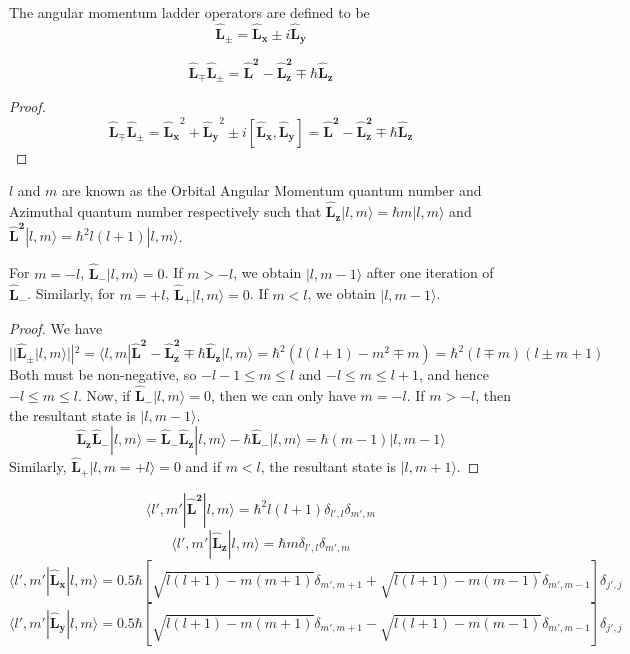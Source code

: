 \documentclass[a4paper]{article}
\begin{document}
\begin{defi}
The angular momentum ladder operators are defined to be
$$\mathbf{\hat{L}_{\pm}}=\mathbf{\hat{L}_x}\pm i\mathbf{\hat{L}_y}$$
\end{defi}
\begin{thm}
$$\mathbf{\hat{L}_{\mp}}\mathbf{\hat{L}_{\pm}}=\mathbf{\hat{L}^2}-\mathbf{\hat{L}_z^2}\mp\hbar\mathbf{\hat{L}_z}$$
\end{thm}
\begin{proof}
$$\mathbf{\hat{L}_{\mp}}\mathbf{\hat{L}_{\pm}}=\mathbf{\hat{L}_x}^2+\mathbf{\hat{L}_y}^2\pm i[\mathbf{\hat{L}_x},\mathbf{\hat{L}_y}]=\mathbf{\hat{L}^2}-\mathbf{\hat{L}_z^2}\mp\hbar\mathbf{\hat{L}_z}$$
\end{proof}
\begin{defi}[$l$ and $m$]
$l$ and $m$ are known as the Orbital Angular Momentum quantum number and Azimuthal quantum number respectively such that $\mathbf{\hat{L}_z}|l,m\rangle=\hbar m|l,m\rangle$ and $\mathbf{\hat{L}^2}|l,m\rangle=\hbar^2l(l+1)|l,m\rangle$.
\end{defi}
\begin{thm}
For $m=-l$, $\mathbf{\hat{L}_-}|l,m\rangle=0$. If $m>-l$, we obtain $|l,m-1\rangle$ after one iteration of $\mathbf{\hat{L}_-}$. Similarly, for $m=+l$, $\mathbf{\hat{L}_+}|l,m\rangle=0$. If $m<l$, we obtain $|l,m-1\rangle$.
\end{thm}
\begin{proof}
We have
$$||\mathbf{\hat{L}_{\pm}}|l,m\rangle||^2=\langle l,m|\mathbf{\hat{L}^2}-\mathbf{\hat{L}_z^2}\mp\hbar\mathbf{\hat{L}_z}|l,m\rangle=\hbar^2(l(l+1)-m^2\mp m)=\hbar^2(l\mp m)(l\pm m+1)$$
Both must be non-negative, so $-l-1\leq m\leq l$ and $-l\leq m\leq l+1$, and hence $-l\leq m\leq l$. Now, if $\mathbf{\hat{L}_-}|l,m\rangle=0$, then we can only have $m=-l$. If $m>-l$, then the resultant state is $|l,m-1\rangle$.
$$\mathbf{\hat{L}_z}\mathbf{\hat{L}_-}|l,m\rangle=\mathbf{\hat{L}_-}\mathbf{\hat{L}_z}|l,m\rangle-\hbar\mathbf{\hat{L}_-}|l,m\rangle=\hbar(m-1)|l,m-1\rangle$$
Similarly, $\mathbf{\hat{L}_+}|l,m=+l\rangle=0$ and if $m<l$, the resultant state is $|l,m+1\rangle$.
\end{proof}
\begin{thm}
$$\langle l',m'|\mathbf{\hat{L}^2}|l,m\rangle=\hbar^2l(l+1)\delta_{l',l}\delta_{m',m}$$
$$\langle l',m'|\mathbf{\hat{L}_z}|l,m\rangle=\hbar m\delta_{l',l}\delta_{m',m}$$
$$\langle l',m'|\mathbf{\hat{L}_x}|l,m\rangle=0.5\hbar[\sqrt{l(l+1)-m(m+1)}\delta_{m',m+1}+\sqrt{l(l+1)-m(m-1)}\delta_{m',m-1}]\delta_{j',j}$$
$$\langle l',m'|\mathbf{\hat{L}_y}|l,m\rangle=0.5\hbar[\sqrt{l(l+1)-m(m+1)}\delta_{m',m+1}-\sqrt{l(l+1)-m(m-1)}\delta_{m',m-1}]\delta_{j',j}$$
\end{thm}
\end{document}
